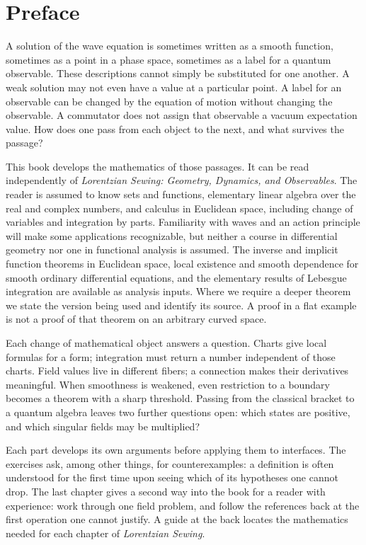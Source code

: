 \chapter*{Preface}
A solution of the wave equation is sometimes written as a smooth function, sometimes as a point in a phase space, sometimes as a label for a quantum observable. These descriptions cannot simply be substituted for one another. A weak solution may not even have a value at a particular point. A label for an observable can be changed by the equation of motion without changing the observable. A commutator does not assign that observable a vacuum expectation value. How does one pass from each object to the next, and what survives the passage?

This book develops the mathematics of those passages. It can be read independently of \emph{Lorentzian Sewing: Geometry, Dynamics, and Observables}. The reader is assumed to know sets and functions, elementary linear algebra over the real and complex numbers, and calculus in Euclidean space, including change of variables and integration by parts. Familiarity with waves and an action principle will make some applications recognizable, but neither a course in differential geometry nor one in functional analysis is assumed. The inverse and implicit function theorems in Euclidean space, local existence and smooth dependence for smooth ordinary differential equations, and the elementary results of Lebesgue integration are available as analysis inputs. Where we require a deeper theorem we state the version being used and identify its source. A proof in a flat example is not a proof of that theorem on an arbitrary curved space.

Each change of mathematical object answers a question. Charts give local formulas for a form; integration must return a number independent of those charts. Field values live in different fibers; a connection makes their derivatives meaningful. When smoothness is weakened, even restriction to a boundary becomes a theorem with a sharp threshold. Passing from the classical bracket to a quantum algebra leaves two further questions open: which states are positive, and which singular fields may be multiplied?

Each part develops its own arguments before applying them to interfaces. The exercises ask, among other things, for counterexamples: a definition is often understood for the first time upon seeing which of its hypotheses one cannot drop. The last chapter gives a second way into the book for a reader with experience: work through one field problem, and follow the references back at the first operation one cannot justify. A guide at the back locates the mathematics needed for each chapter of \emph{Lorentzian Sewing}.

